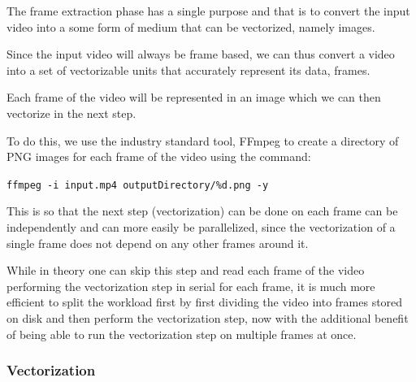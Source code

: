 \documentclass[12pt]{article}
\newcommand{\sentence}{} %
\newcommand{\code}[1]{\texttt{#1}}
\begin{document}
    \tab
    The frame extraction phase has a single purpose and that is to convert the input video into a some form of medium
    that can be vectorized, namely images.
    \sentence
    Since the input video will always be frame based, we can thus convert a video into a set of vectorizable units
    that accurately represent its data, frames.
    \sentence
    Each frame of the video will be represented in an image which we can then vectorize in the next step.
    \sentence
    To do this, we use the industry standard tool, FFmpeg to create a directory of PNG images for each frame of the
    video using the command:
    \begin{center}
        \code{ffmpeg -i input.mp4 outputDirectory/\%d.png -y}
    \end{center}
    \sentence
    This is so that the next step (vectorization) can be done on each frame can be independently and can more easily
    be parallelized, since the vectorization of a single frame does not depend on any other frames around it.
    \sentence
    While in theory one can skip this step and read each frame of the video performing the vectorization step in
    serial for each frame, it is much more efficient to split the workload first by first dividing the video into
    frames stored on disk and then perform the vectorization step, now with the additional benefit of being able to
    run the vectorization step on multiple frames at once.


    \subsubsection{Vectorization}\label{subsubsec:vectorization}
\end{document}
